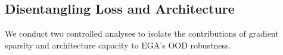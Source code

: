 \documentclass{article}
\begin{document}




\subsection{Disentangling Loss and Architecture}
\label{sec:loss_arch}

We conduct two controlled analyses to isolate the contributions of gradient sparsity and architecture capacity to EGA's OOD robustness.
\end{document}
